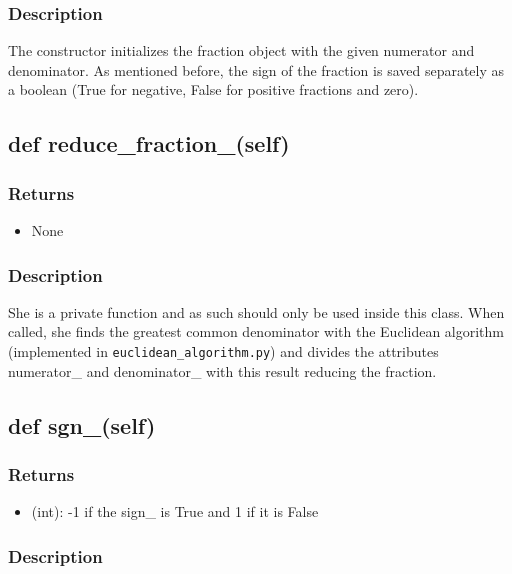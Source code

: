 \documentclass[refman]{scrartcl}
\begin{document}
\subsubsection*{Description}

The constructor initializes the fraction object with the given numerator and denominator. As mentioned before, the sign of the fraction is saved separately as a boolean (True for negative, False for positive fractions and zero). 

\subsection{def reduce\_fraction\_(self)}

\subsubsection*{Returns}

\begin{itemize}
	\item None
\end{itemize}

\subsubsection*{Description}

She is a private function and as such should only be used inside this class. When called, she finds the greatest common denominator with the Euclidean algorithm (implemented in \texttt{euclidean\_algorithm.py}) and divides the attributes numerator\_ and denominator\_ with this result reducing the fraction.

\subsection{def sgn\_(self)}

\subsubsection*{Returns}

\begin{itemize}
	\item (int): -1 if the sign\_ is True and 1 if it is False
\end{itemize}

\subsubsection*{Description}
\end{document}
